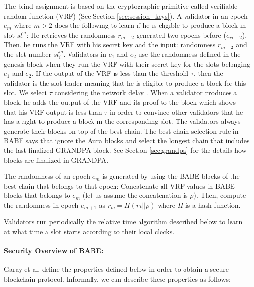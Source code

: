 The blind assignment is based on the cryptographic primitive called verifiable random function (VRF) \cite{vrf} (See Section \ref{sec:session_keys}). 
A validator in an epoch $e_m$ where $m > 2$ does the following to learn if he is eligible to produce a block in slot $sl_i^m$: He retrieves the randomness $r_{m-2}$ generated two epochs %
before ($e_{m-2}$). Then, he runs the VRF with his secret key and the input:  randomness $r_{m-2}$ and the slot number $ sl_i^m $.  Validators in $e_1$ and $e_2$ use the randomness defined in the genesis block when they run the VRF with their secret key for the slots belonging $e_1$ and $e_2$. If the output of the VRF is less than the threshold $ \tau $, then the validator is the slot leader meaning that he is eligible to produce a block for this slot. We select $\tau$ considering the network delay \cite{babe}. 
When a validator produces a block, he adds the output of the VRF and its proof to the block which shows that his VRF output is less than $\tau$  in order to convince other validators that he has a right to produce a block in the corresponding slot. The validators always generate their blocks on top of the best chain.
The best chain selection rule in BABE says that ignore the Aura blocks and select the longest chain that includes the last finalized GRANDPA block. See Section \ref{sec:grandpa} for the details how blocks are finalized in GRANDPA.

The randomness of an epoch $e_m$ is generated by using the BABE blocks of the best chain that belongs to that epoch: Concatenate all  VRF values in BABE blocks that belongs to $e_m$  (let us assume  the concatenation is \(\rho\)). Then, compute the randomness in epoch $e_{m+1}$ as $r_{m} = H(m
||\rho)$ where $ H $ is a hash function. 

Validators run periodically the relative time algorithm described below to learn %
at what time a slot starts according to their local clocks.




\paragraph{Security Overview of BABE:} Garay et al. \cite{backbone} define the properties defined below in order to obtain a secure blockchain protocol. Informally, we can describe these properties as follows:

